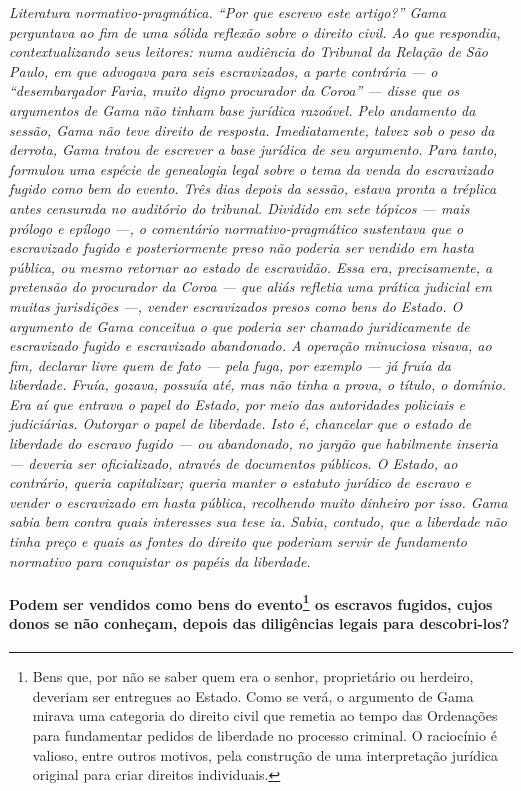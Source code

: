 {\begin{resumo}
\emph{Literatura normativo-pragmática. ``Por que escrevo este artigo?''
Gama perguntava ao fim de uma sólida reflexão sobre o direito civil. Ao
que respondia, contextualizando seus leitores: numa audiência do
Tribunal da Relação de São Paulo, em que advogava para seis
escravizados, a parte contrária --- o ``desembargador Faria, muito digno
procurador da Coroa'' --- disse que os argumentos de Gama não tinham base
jurídica razoável. Pelo andamento da sessão, Gama não teve direito de
resposta. Imediatamente, talvez sob o peso da derrota, Gama tratou de
escrever a base jurídica de seu argumento. Para tanto, formulou uma
espécie de genealogia legal sobre o tema da venda do escravizado fugido
como bem do evento. Três dias depois da sessão, estava pronta a tréplica
antes censurada no auditório do tribunal. Dividido em sete tópicos ---
mais prólogo e epílogo ---, o comentário normativo-pragmático sustentava
que o escravizado fugido e posteriormente preso não poderia ser vendido
em hasta pública, ou mesmo retornar ao estado de escravidão. Essa era,
precisamente, a pretensão do procurador da Coroa --- que aliás refletia
uma prática judicial em muitas jurisdições ---, vender escravizados
presos como bens do Estado. O argumento de Gama conceitua o que poderia
ser chamado juridicamente de escravizado fugido e escravizado
abandonado. A operação minuciosa visava, ao fim, declarar livre quem de
fato --- pela fuga, por exemplo --- já fruía da liberdade. Fruía, gozava,
possuía até, mas não tinha a prova, o título, o domínio. Era aí que
entrava o papel do Estado, por meio das autoridades policiais e
judiciárias. Outorgar o papel de liberdade. Isto é, chancelar que o
estado de liberdade do escravo fugido --- ou abandonado, no jargão que
habilmente inseria --- deveria ser oficializado, através de documentos
públicos. O Estado, ao contrário, queria capitalizar; queria manter o
estatuto jurídico de escravo e vender o escravizado em hasta pública,
recolhendo muito dinheiro por isso. Gama sabia bem contra quais
interesses sua tese ia. Sabia, contudo, que a liberdade não tinha preço
e quais as fontes do direito que poderiam servir de fundamento normativo
para conquistar os papéis da liberdade.}
\end{resumo}

\paragraph{Podem ser vendidos como bens do evento\footnote{Bens que, por
  não se saber quem era o senhor, proprietário ou herdeiro, deveriam ser
  entregues ao Estado. Como se verá, o argumento de Gama mirava uma
  categoria do direito civil que remetia ao tempo das Ordenações para
  fundamentar pedidos de liberdade no processo criminal. O raciocínio é
  valioso, entre outros motivos, pela construção de uma interpretação
  jurídica original para criar direitos individuais.} os escravos
fugidos, cujos donos se não conheçam, depois das diligências legais para
descobri-los?}

}
